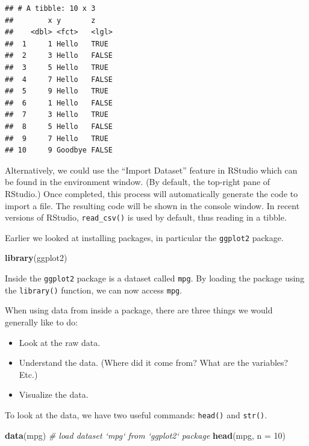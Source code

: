 \documentclass[]{book}
\newenvironment{Shaded}{\begin{snugshade}}{\end{snugshade}}
\newcommand{\KeywordTok}[1]{\textcolor[rgb]{0.13,0.29,0.53}{\textbf{#1}}}
\newcommand{\DataTypeTok}[1]{\textcolor[rgb]{0.13,0.29,0.53}{#1}}
\newcommand{\DecValTok}[1]{\textcolor[rgb]{0.00,0.00,0.81}{#1}}
\newcommand{\CommentTok}[1]{\textcolor[rgb]{0.56,0.35,0.01}{\textit{#1}}}
\newcommand{\NormalTok}[1]{#1}
\providecommand{\tightlist}{%
  \setlength{\itemsep}{0pt}\setlength{\parskip}{0pt}}
\theoremstyle{definition}
\theoremstyle{definition}
\theoremstyle{definition}
\theoremstyle{remark}
\begin{document}
\begin{verbatim}
## # A tibble: 10 x 3
##        x y       z    
##    <dbl> <fct>   <lgl>
##  1     1 Hello   TRUE 
##  2     3 Hello   FALSE
##  3     5 Hello   TRUE 
##  4     7 Hello   FALSE
##  5     9 Hello   TRUE 
##  6     1 Hello   FALSE
##  7     3 Hello   TRUE 
##  8     5 Hello   FALSE
##  9     7 Hello   TRUE 
## 10     9 Goodbye FALSE
\end{verbatim}

Alternatively, we could use the ``Import Dataset'' feature in RStudio
which can be found in the environment window. (By default, the top-right
pane of RStudio.) Once completed, this process will automatically
generate the code to import a file. The resulting code will be shown in
the console window. In recent versions of RStudio, \texttt{read\_csv()}
is used by default, thus reading in a tibble.

Earlier we looked at installing packages, in particular the
\texttt{ggplot2} package.

\begin{Shaded}
\begin{Highlighting}[]
\KeywordTok{library}\NormalTok{(ggplot2)}
\end{Highlighting}
\end{Shaded}

Inside the \texttt{ggplot2} package is a dataset called \texttt{mpg}. By
loading the package using the \texttt{library()} function, we can now
access \texttt{mpg}.

When using data from inside a package, there are three things we would
generally like to do:

\begin{itemize}
\tightlist
\item
  Look at the raw data.
\item
  Understand the data. (Where did it come from? What are the variables?
  Etc.)
\item
  Visualize the data.
\end{itemize}

To look at the data, we have two useful commands: \texttt{head()} and
\texttt{str()}.

\begin{Shaded}
\begin{Highlighting}[]
\KeywordTok{data}\NormalTok{(mpg)  }\CommentTok{# load dataset `mpg` from `ggplot2` package}
\KeywordTok{head}\NormalTok{(mpg, }\DataTypeTok{n =} \DecValTok{10}\NormalTok{)}
\end{Highlighting}
\end{Shaded}
\end{document}
